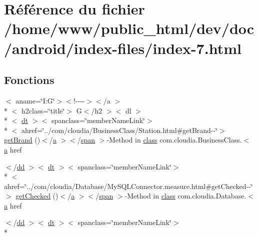 \hypertarget{index-7_8html}{\section{Référence du fichier /home/www/public\-\_\-html/dev/doc/android/index-\/files/index-\/7.html}
\label{index-7_8html}
}
\subsection*{Fonctions}
\begin{DoxyCompactItemize}
\item 
$<$ aname=\char`\"{}I\-:\-G\char`\"{}$>$$<$!-\/-\/-\/-\/$>$$<$/a $>$\\*
$<$ h2class=\char`\"{}title\char`\"{}$>$ G$<$/h2 $>$$<$ dl $>$\\*
$<$ \hyperlink{stylesheet_8css_a107565fb4039d33b041380d6e0ea1d80}{dt} $>$$<$ spanclass=\char`\"{}member\-Name\-Link\char`\"{}$>$\\*
$<$ ahref=\char`\"{}../com/cloudia/Business\-Class/Station.\-html\#get\-Brand-\/-\/\char`\"{}$>$ \hyperlink{index-7_8html_aab313300f139f9777f3db75e872ce33e}{get\-Brand} ()$<$/\hyperlink{style_8css_a5e8981582017bb8b84c21f148345d1f7}{a} $>$$<$/\hyperlink{stylesheet_8css_a8343996ebcf16220b04e54659aac31cc}{span} $>$-\/Method in \hyperlink{_tools_8html_acf06f836132665ba8114f5a414c2403f}{class} com.\-cloudia.\-Business\-Class.$<$ \hyperlink{style_8css_a5e8981582017bb8b84c21f148345d1f7}{a} href
\item 
$<$/\hyperlink{stylesheet_8css_a47f4718a86835a7771ec592ece845221}{dd} $>$$<$ \hyperlink{stylesheet_8css_a107565fb4039d33b041380d6e0ea1d80}{dt} $>$$<$ spanclass=\char`\"{}member\-Name\-Link\char`\"{}$>$\\*
$<$ ahref=\char`\"{}../com/cloudia/Database/My\-S\-Q\-L\-Connector.\-measure.\-html\#get\-Checked-\/-\/\char`\"{}$>$ \hyperlink{index-7_8html_accfdcd92e02bf04e8b208562864538ea}{get\-Checked} ()$<$/\hyperlink{style_8css_a5e8981582017bb8b84c21f148345d1f7}{a} $>$$<$/\hyperlink{stylesheet_8css_a8343996ebcf16220b04e54659aac31cc}{span} $>$-\/Method in \hyperlink{_tools_8html_acf06f836132665ba8114f5a414c2403f}{class} com.\-cloudia.\-Database.$<$ \hyperlink{style_8css_a5e8981582017bb8b84c21f148345d1f7}{a} href
\item 
$<$/\hyperlink{stylesheet_8css_a47f4718a86835a7771ec592ece845221}{dd} $>$$<$ \hyperlink{stylesheet_8css_a107565fb4039d33b041380d6e0ea1d80}{dt} $>$$<$ spanclass=\char`\"{}member\-Name\-Link\char`\"{}$>$\\*

\end{DoxyCompactItemize}
